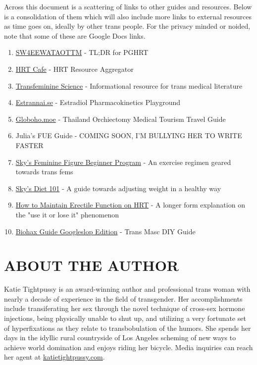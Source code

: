 \documentclass{article}
\begin{document}
Across this document is a scattering of links to other guides and resources. Below is a consolidation of them which will also include more links to external resources as time goes on, ideally by other trans people. For the privacy minded or noided, note that some of these are Google Docs links.

\begin{enumerate}
  \item \href{https://startwith4mgestradiolenanthateweeklyandtestatonetothreemonths.com/}{SW4EEWATAOTTM} - TL;DR for PGHRT
  \item \href{https://hrtcafe.net/}{HRT Cafe} - HRT Resource Aggregator
  \item \href{https://transfemscience.org/}{Transfeminine Science} - Informational resource for trans medical literature
  \item \href{http://estrannai.se}{Estrannai.se} - Estradiol Pharmacokinetics Playground
  \item \href{https://globoho.moe/}{Globoho.moe} - Thailand Orchiectomy Medical Tourism Travel Guide 
  \item Julia's FUE Guide - COMING SOON, I'M BULLYING HER TO WRITE FASTER
  \item \href{https://docs.google.com/document/d/1-NyE5EY5TTaRRMhk7HlTbKJ7HifjEsA4jlDO1qKQVl0/edit?tab=t.0}{Sky's Feminine Figure Beginner Program} - An exercise regimen geared towards trans fems
  \item \href{https://docs.google.com/document/d/114sztSw1aVWM2pXLDl9NrHklyvewz3EmFiHiisjM71k/edit?tab=t.0}{Sky's Diet 101} - A guide towards adjusting weight in a healthy way
  \item \href{https://stainedglasswoman.substack.com/p/how-to-maintain-your-penis-function}{How to Maintain Erectile Function on HRT} - A longer form explanation on the "use it or lose it" phenomenon
  \item \href{hhttps://docs.google.com/document/d/1DXFxzN0XTudPZez_SO61fpqncRLPH_Be_QG_8Pcz9LU/edit?pli=1&tab=t.0}{Biohax Guide Googleslop Edition} - Trans Masc DIY Guide
\end{enumerate}

\section*{ABOUT THE AUTHOR}

Katie Tightpussy is an award-winning author and professional trans woman with nearly a decade of experience in the field of transgender. Her accomplishments include transiferating her sex through the novel technique of cross-sex hormone injections, being physically unable to shut up, and utilizing a very fortunate set of hyperfixations as they relate to transbobulation of the humors. She spends her days in the idyllic rural countryside of Los Angeles scheming of new ways to achieve world domination and enjoys riding her bicycle. Media inquiries can reach her agent at \href{http://katietightpussy.com}{katietightpussy.com}.
\end{document}
